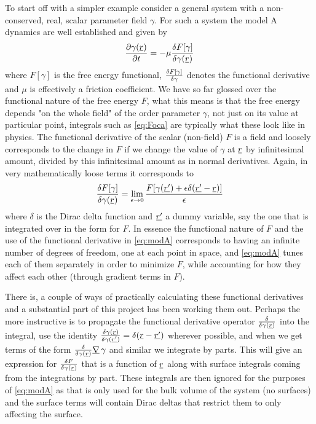 \documentclass[12pt]{article}
\newcommand{\suf}[2]{\stackunder[0.5pt]{\stackunder[1pt]{\ensuremath{#1}}{\rule{\widthof{\ensuremath{#2}}*\real{0.9}}{.1ex}}}{}}
\newcommand{\su}[1]{\suf{#1}{#1}}
\newcommand{\ssu}[1]{\scriptsize\su{#1}\normalsize}
\newcommand{\mgrad}{\ensuremath{\suf{\nabla}{K}\,}}
\begin{document}
        To start off with a simpler example consider a general system with a non-conserved, real, scalar parameter field $\gamma$.
        For such a system the model A dynamics are well established and given by
        \begin{equation}\label{eq:modA}
            \pdv{\gamma(\su{r})}{t} = -\mu \fdv{F[\gamma]}{\gamma(\su{r})}
        \end{equation}
        where $F[\gamma]$ is the free energy functional, $\fdv{F[\gamma]}{\gamma}$ denotes the functional derivative and $\mu$ is effectively a friction coefficient\cite{kardarStatisticalPhysicsFields2007}.
        We have so far glossed over the functional nature of the free energy $F$, what this means is that the free energy depends "on the whole field" of the order parameter $\gamma$, not just on its value at particular point, integrals such as \cref{eq:Foca} are typically what these look like in physics.
        The functional derivative of the scalar (non-field) $F$ is a field and loosely corresponds to the change in $F$ if we change the value of $\gamma$ at $\su{r}$ by infinitesimal amount, divided by this infinitesimal amount as in normal derivatives.
        Again, in very mathematically loose terms it corresponds to
        \begin{equation}
            \fdv{F[\gamma]}{\gamma(\su{r})} = \lim_{\epsilon \rightarrow 0} \frac{F[\gamma(\su{r'}) + \epsilon\delta(\su{r'} - \su{r})]}{\epsilon}
        \end{equation}
        where $\delta$ is the Dirac delta function and $\su{r'}$ a dummy variable, say the one that is integrated over in the form for $F$.
        In essence the functional nature of $F$ and the use of the functional derivative in \cref{eq:modA} corresponds to having an infinite number of degrees of freedom, one at each point in space, and \cref{eq:modA} tunes each of them separately in order to minimize $F$, while accounting for how they affect each other (through gradient terms in $F$).

        There is, a couple of ways of practically calculating these functional derivatives and a substantial part of this project has been working them out.
        Perhaps the more instructive is to propagate the functional derivative operator $\fdv{\gamma(\ssu{r})}$ into the integral, use the identity $\fdv{\gamma(\ssu{r})}{\gamma(\ssu{r'})} = \delta(\su{r} - \su{r'})$ wherever possible, and when we get terms of the form $\fdv{\gamma(\ssu{r})} \mgrad \gamma$ and similar we integrate by parts.
        This will give an expression for $\fdv{F}{\gamma(\ssu{r})}$ that is a function of $\su{r}$ along with surface integrals coming from the integrations by part.
        These integrals are then ignored for the purposes of \cref{eq:modA} as that is only used for the bulk volume of the system (no surfaces) and the surface terms will contain Dirac deltas that restrict them to only affecting the surface.
\end{document}
